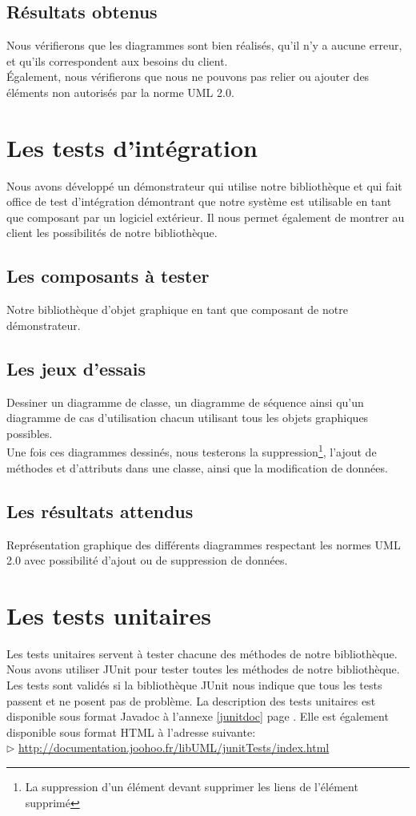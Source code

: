 \documentclass[12pt,a4paper,openany]{report}
\begin{document}
		\subsection{Résultats obtenus}
		Nous vérifierons que les diagrammes sont bien réalisés, qu'il n'y a aucune erreur, et qu'ils correspondent aux besoins du client.\\
		Également, nous vérifierons que nous ne pouvons pas relier ou ajouter des éléments non autorisés par la norme UML 2.0.

	\section{Les tests d'intégration}
		Nous avons développé un démonstrateur qui utilise notre bibliothèque et qui fait office de test d'intégration démontrant que notre système
		est utilisable en tant que composant par un logiciel extérieur. Il nous permet également de montrer au client les possibilités de notre bibliothèque.

		\subsection{Les composants à tester}
			Notre bibliothèque d'objet graphique en tant que composant de notre démonstrateur.

			\subsection{Les jeux d'essais}
			Dessiner un diagramme de classe, un diagramme de séquence ainsi qu'un diagramme de cas d'utilisation chacun utilisant tous les objets graphiques 
			possibles. \\
			Une fois ces diagrammes dessinés, nous testerons la suppression\footnote{La suppression d'un élément devant supprimer les liens de l'élément supprimé},
			l'ajout de méthodes et d'attributs dans une classe, ainsi que la modification de données.

			\subsection{Les résultats attendus}
			Représentation graphique des différents diagrammes respectant les normes UML 2.0 avec possibilité d'ajout ou de suppression de données.
	\section{Les tests unitaires}
	Les tests unitaires servent à tester chacune des méthodes de notre bibliothèque.\\
	Nous avons utiliser JUnit pour tester toutes les méthodes de notre bibliothèque. Les tests sont validés si 
	la bibliothèque JUnit nous indique que tous les tests passent et ne posent pas de problème.
	La description des tests unitaires est disponible sous format Javadoc à l'annexe \ref{junitdoc} page \pageref{junitdoc}.
	Elle est également disponible sous format HTML à l'adresse suivante: \\
	$\rhd$ \url{http://documentation.joohoo.fr/libUML/junitTests/index.html}\\
		
\end{document}
